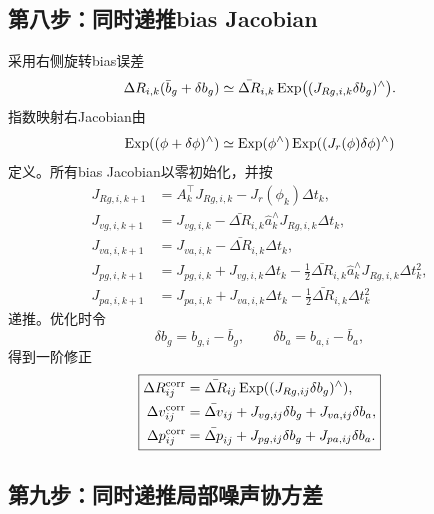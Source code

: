 \subsection*{第八步：同时递推bias Jacobian}

采用右侧旋转bias误差
\[
    \Delta R_{i,k}(\bar b_g+\delta b_g)
    \simeq
    \bar{\Delta R}_{i,k}
    \operatorname{Exp}\bigl((J_{R g,i,k}\delta b_g)^\wedge\bigr).
\]
指数映射右Jacobian由
\[
    \operatorname{Exp}((\phi+\delta\phi)^\wedge)
    \simeq
    \operatorname{Exp}(\phi^\wedge)
    \operatorname{Exp}((J_r(\phi)\delta\phi)^\wedge)
\]
定义。所有bias Jacobian以零初始化，并按
\[
\boxed{
\begin{aligned}
    J_{R g,i,k+1}
    &=A_k^\top J_{R g,i,k}
      -J_r(\phi_k)\Delta t_k,\\
    J_{v g,i,k+1}
    &=J_{v g,i,k}
      -\bar{\Delta R}_{i,k}\widehat a_k^\wedge
       J_{R g,i,k}\Delta t_k,\\
    J_{v a,i,k+1}
    &=J_{v a,i,k}
      -\bar{\Delta R}_{i,k}\Delta t_k,\\
    J_{p g,i,k+1}
    &=J_{p g,i,k}+J_{v g,i,k}\Delta t_k
      -\frac12\bar{\Delta R}_{i,k}\widehat a_k^\wedge
       J_{R g,i,k}\Delta t_k^2,\\
    J_{p a,i,k+1}
    &=J_{p a,i,k}+J_{v a,i,k}\Delta t_k
      -\frac12\bar{\Delta R}_{i,k}\Delta t_k^2
\end{aligned}
}
\]
递推。优化时令
\[
    \delta b_g=b_{g,i}-\bar b_g,
    \qquad
    \delta b_a=b_{a,i}-\bar b_a,
\]
得到一阶修正
\[
\boxed{
\begin{aligned}
    \Delta R_{ij}^{\mathrm{corr}}
    &=\bar{\Delta R}_{ij}
      \operatorname{Exp}((J_{R g,ij}\delta b_g)^\wedge),\\
    \Delta v_{ij}^{\mathrm{corr}}
    &=\bar{\Delta v}_{ij}
      +J_{v g,ij}\delta b_g+J_{v a,ij}\delta b_a,\\
    \Delta p_{ij}^{\mathrm{corr}}
    &=\bar{\Delta p}_{ij}
      +J_{p g,ij}\delta b_g+J_{p a,ij}\delta b_a.
\end{aligned}
}
\]

\subsection*{第九步：同时递推局部噪声协方差}

